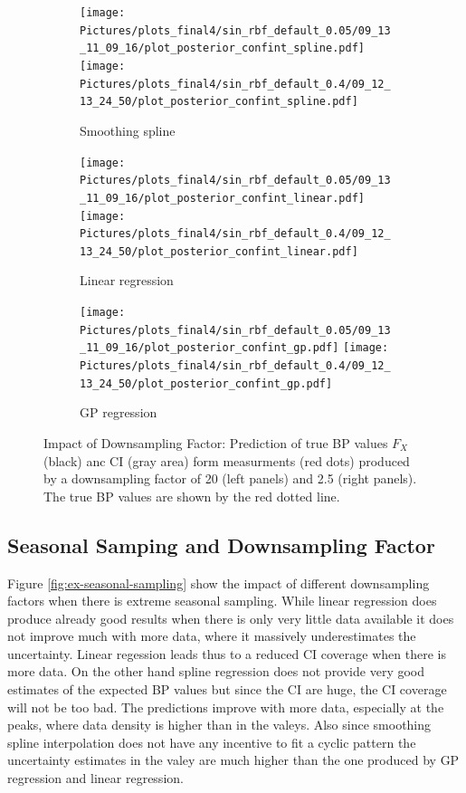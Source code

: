 \begin{figure}
\begin{subfigure}{\textwidth}
    \centering
    \texttt{[image: 
       Pictures/plots\_final4/sin\_rbf\_default\_0.05/09\_13\_11\_09\_16/plot\_posterior\_confint\_spline.pdf]}
    \texttt{[image: 
       Pictures/plots\_final4/sin\_rbf\_default\_0.4/09\_12\_13\_24\_50/plot\_posterior\_confint\_spline.pdf]}
  \caption{Smoothing spline}
\end{subfigure}

\begin{subfigure}{\textwidth}
    \centering
    \texttt{[image: 
  Pictures/plots\_final4/sin\_rbf\_default\_0.05/09\_13\_11\_09\_16/plot\_posterior\_confint\_linear.pdf]}
    \texttt{[image: 
  Pictures/plots\_final4/sin\_rbf\_default\_0.4/09\_12\_13\_24\_50/plot\_posterior\_confint\_linear.pdf]}
  \caption{Linear regression }
\end{subfigure}

\begin{subfigure}{\textwidth}
    \centering
    \texttt{[image: 
  Pictures/plots\_final4/sin\_rbf\_default\_0.05/09\_13\_11\_09\_16/plot\_posterior\_confint\_gp.pdf]}
    \texttt{[image: 
  Pictures/plots\_final4/sin\_rbf\_default\_0.4/09\_12\_13\_24\_50/plot\_posterior\_confint\_gp.pdf]}
  \caption{GP regression}
\end{subfigure}\hfill

\caption[Impact of Downsampling Factor]{Impact of Downsampling Factor:
    Prediction of true BP values $F_X$ (black)
    anc CI (gray area) form measurments (red dots) produced by
    a downsampling factor of 20 (left panels) and 2.5 (right panels).
    The true BP values are shown by the red dotted line.}
\label{fig:ex-downsampling-factor}
\end{figure}


\subsection{Seasonal Samping and Downsampling Factor}

Figure \ref{fig:ex-seasonal-sampling} show the impact of different
downsampling factors when there is extreme seasonal sampling.
While linear regression does produce already good results when there is only
very little data available it does not improve much with more data, where
it massively underestimates the uncertainty. Linear regession leads thus
to a reduced CI coverage when there is more data.
On the other hand spline regression does not provide very good
estimates of the expected BP values but since
the CI are huge, the CI coverage will not be too bad.
The predictions improve with more data, especially
at the peaks, where data density is higher than in the valeys.
Also since smoothing spline interpolation does not have any incentive
to fit a cyclic pattern the uncertainty estimates in the valey are much
higher than the one produced by GP regression and linear regression.



